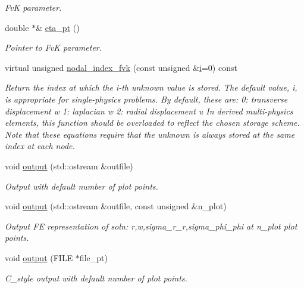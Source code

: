 \begin{DoxyCompactItemize}
\begin{DoxyCompactList}\small\item\em FvK parameter. \end{DoxyCompactList}\item 
double $\ast$\& \hyperlink{classoomph_1_1AxisymFoepplvonKarmanEquations_acdc1b386f9d5bf16512080ce0bfbbdee}{eta\+\_\+pt} ()
\begin{DoxyCompactList}\small\item\em Pointer to FvK parameter. \end{DoxyCompactList}\item 
virtual unsigned \hyperlink{classoomph_1_1AxisymFoepplvonKarmanEquations_a481e2bbbd87723e7b91a79bcb83e361c}{nodal\+\_\+index\+\_\+fvk} (const unsigned \&\hyperlink{cfortran_8h_adb50e893b86b3e55e751a42eab3cba82}{i}=0) const
\begin{DoxyCompactList}\small\item\em Return the index at which the i-\/th unknown value is stored. The default value, i, is appropriate for single-\/physics problems. By default, these are\+: 0\+: transverse displacement w 1\+: laplacian w 2\+: radial displacement u In derived multi-\/physics elements, this function should be overloaded to reflect the chosen storage scheme. Note that these equations require that the unknown is always stored at the same index at each node. \end{DoxyCompactList}\item 
void \hyperlink{classoomph_1_1AxisymFoepplvonKarmanEquations_a162b507ce3d9126a558790e77ec86e70}{output} (std\+::ostream \&outfile)
\begin{DoxyCompactList}\small\item\em Output with default number of plot points. \end{DoxyCompactList}\item 
void \hyperlink{classoomph_1_1AxisymFoepplvonKarmanEquations_a704051a00a2c8624edb98f3ba05e63a2}{output} (std\+::ostream \&outfile, const unsigned \&n\+\_\+plot)
\begin{DoxyCompactList}\small\item\em Output FE representation of soln\+: r,w,sigma\+\_\+r\+\_\+r,sigma\+\_\+phi\+\_\+phi at n\+\_\+plot plot points. \end{DoxyCompactList}\item 
void \hyperlink{classoomph_1_1AxisymFoepplvonKarmanEquations_a236f169caf08c0214ff686e939b9dd33}{output} (F\+I\+LE $\ast$file\+\_\+pt)
\begin{DoxyCompactList}\small\item\em C\+\_\+style output with default number of plot points. \end{DoxyCompactList}\item 

\end{DoxyCompactItemize}
